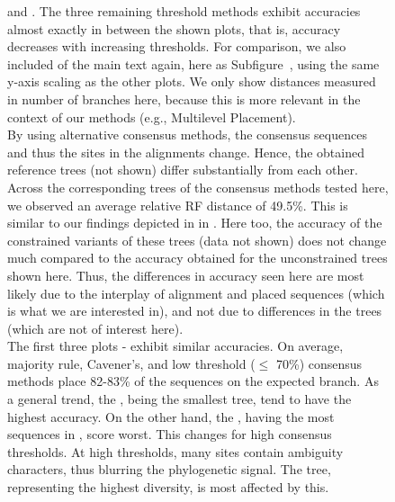 \begin{figure}[hpbt]
{         and .
        The three remaining threshold methods exhibit accuracies almost exactly in between the shown plots,
        that is, accuracy decreases with increasing thresholds.
        For comparison, we also included  of the main text again,
        here as Subfigure~,
        using the same y-axis scaling as the other plots.
        We only show distances measured in number of branches here,
        because this is more relevant in the context of our methods (e.g., Multilevel Placement).
        \\
        By using alternative consensus methods, the consensus sequences and thus the sites in the alignments change.
        Hence, the obtained reference trees (not shown) differ substantially from each other.
        Across the corresponding trees of the consensus methods tested here,
        we observed an average relative RF distance of 49.5\%.
        This is similar to our findings depicted in in .
        Here too, the accuracy of the constrained variants of these trees (data not shown)
        does not change much compared to the accuracy obtained for the unconstrained trees shown here.
        Thus, the differences in accuracy seen here are most likely due to
        the interplay of alignment and placed sequences (which is what we are interested in),
        and not due to differences in the trees (which are not of interest here).
        \\
        The first three plots -
        exhibit similar accuracies.
        On average, majority rule, Cavener's, and low threshold ($\leq$ 70\%) consensus methods
        place 82-83\% of the sequences on the expected branch.
        As a general trend, the , being the smallest tree, tend to have the highest accuracy.
        On the other hand, the , having the most sequences in , score worst.
        This changes for high consensus thresholds.
        At high thresholds, many sites contain ambiguity characters, thus blurring the phylogenetic signal.
        The  tree, representing the highest diversity, is most affected by this.
    }
    \label{fig:consensi_backbone}
\end{figure}

